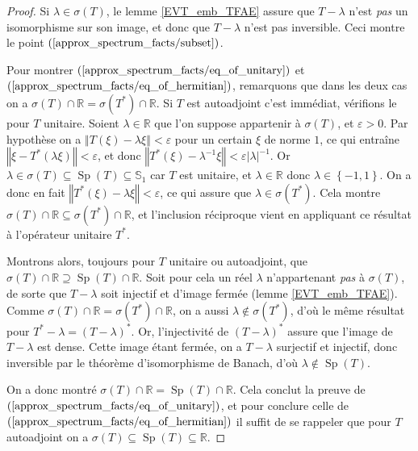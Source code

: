 \documentclass[a4paper,12pt]{article}
\newcommand{\R}{\mathbb{R}}
\newcommand{\norm}[1]{\left\Vert #1\right\Vert}
\newcommand{\abs}[1]{\left\vert#1\right\vert}
\newcommand{\set}[1]{\left\{ #1 \right\}}
\newcommand{\inv}{^{-1}}
\DeclareMathOperator{\Sp}{Sp}
\begin{document}
\begin{proof}
    Si $\lambda\in\sigma(T)$, le lemme \ref{EVT_emb_TFAE} assure que $T-\lambda$ n'est \emph{pas} un isomorphisme sur son image, et donc que 
    $T-\lambda$ n'est pas inversible. Ceci montre le point $(\ref{approx_spectrum_facts/subset})$.

    Pour montrer $(\ref{approx_spectrum_facts/eq_of_unitary})$ et $(\ref{approx_spectrum_facts/eq_of_hermitian})$, remarquons que dans les deux cas
    on a $\sigma(T)\cap\R = \sigma(T^*)\cap\R$. Si $T$ est autoadjoint c'est immédiat, vérifions le pour $T$ unitaire. Soient $\lambda\in\R$ que l'on
    suppose appartenir à $\sigma(T)$, et $\varepsilon>0$. Par hypothèse on a $\norm{T(\xi) - \lambda\xi}<\varepsilon$ pour un certain $\xi$ de norme $1$,
    ce qui entraîne $\norm{\xi - T^*(\lambda\xi)}<\varepsilon$, et donc $\norm{T^*(\xi) - \lambda\inv\xi}<\varepsilon\abs{\lambda}\inv$. Or $\lambda\in\sigma(T)\subseteq\Sp(T)\subseteq\mathbb{S}_1$
    car $T$ est unitaire, et $\lambda\in\R$ donc $\lambda\in\set{-1, 1}$. On a donc en fait $\norm{T^*(\xi) - \lambda\xi}<\varepsilon$, ce qui 
    assure que $\lambda\in\sigma(T^*)$. Cela montre $\sigma(T)\cap\R\subseteq\sigma(T^*)\cap\R$, et
    l'inclusion réciproque vient en appliquant ce résultat à l'opérateur unitaire $T^*$.

    Montrons alors, toujours pour $T$ unitaire ou autoadjoint, que $\sigma(T)\cap\R \supseteq \Sp(T)\cap\R$. Soit pour cela un réel $\lambda$
    n'appartenant \emph{pas} à $\sigma(T)$, de sorte que $T-\lambda$ soit injectif et d'image fermée (lemme \ref{EVT_emb_TFAE}). 
    Comme $\sigma(T)\cap\R = \sigma(T^*)\cap\R$, on a aussi $\lambda\notin\sigma(T^*)$, d'où le même résultat pour $T^* - \lambda = (T-\lambda)^*$. Or, 
    l'injectivité de $(T-\lambda)^*$ assure que l'image de $T-\lambda$ est dense. Cette image étant fermée, on a $T-\lambda$ surjectif et injectif,
    donc inversible par le théorème d'isomorphisme de Banach, d'où $\lambda\notin\Sp(T)$. 

    On a donc montré $\sigma(T)\cap\R = \Sp(T)\cap\R$. Cela conclut la preuve de $(\ref{approx_spectrum_facts/eq_of_unitary})$,
    et pour conclure celle de $(\ref{approx_spectrum_facts/eq_of_hermitian})$ il suffit de se rappeler que pour $T$ autoadjoint on a $\sigma(T) \subseteq \Sp(T) \subseteq\R$.
\end{proof}

\end{document}
